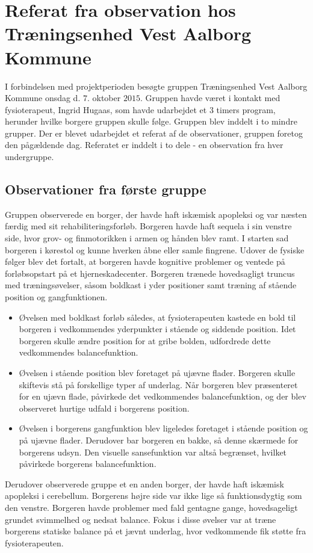 \chapter{Referat fra observation hos Træningsenhed Vest Aalborg Kommune}\label{Ref_observation}
I forbindelsen med projektperioden besøgte gruppen Træningsenhed Vest Aalborg Kommune onsdag d. $7$. oktober $2015$. Gruppen havde været i kontakt med fysioterapeut, Ingrid Hugaas, som havde udarbejdet et $3$ timers program, herunder hvilke borgere gruppen skulle følge. Gruppen blev inddelt i to mindre grupper. Der er blevet udarbejdet et referat af de observationer, gruppen foretog den pågældende dag. Referatet er inddelt i to dele - en observation fra hver undergruppe. 

\section{Observationer fra første gruppe}
Gruppen observerede en borger, der havde haft iskæmisk apopleksi og var næsten færdig med sit rehabiliteringsforløb. Borgeren havde haft sequela i sin venstre side, hvor grov- og finmotorikken i armen og hånden blev ramt. I starten sad borgeren i kørestol og kunne hverken åbne eller samle fingrene. Udover de fysiske følger blev det fortalt, at borgeren havde kognitive problemer og ventede på forløbsopstart på et hjerneskadecenter. Borgeren trænede hovedsagligt truncus med træningsøvelser, såsom boldkast i yder positioner samt træning af stående position og gangfunktionen. 
\begin{itemize}
\item Øvelsen med boldkast forløb således, at fysioterapeuten kastede en bold til borgeren i vedkommendes yderpunkter i stående og siddende position. Idet borgeren skulle ændre position for at gribe bolden, udfordrede dette vedkommendes balancefunktion. 
\item Øvelsen i stående position blev foretaget på ujævne flader. Borgeren skulle skiftevis stå på forskellige typer af underlag. Når borgeren blev præsenteret for en ujævn flade, påvirkede det vedkommendes balancefunktion, og der blev observeret hurtige udfald i borgerens position. 
\item Øvelsen i borgerens gangfunktion blev ligeledes foretaget i stående position og på ujævne flader. Derudover bar borgeren en bakke, så denne skærmede for borgerens udsyn. Den visuelle sansefunktion var altså begrænset, hvilket påvirkede borgerens balancefunktion. 
\end{itemize}
\noindent Derudover observerede gruppe et en anden borger, der havde haft iskæmisk apopleksi i cerebellum. Borgerens højre side var ikke lige så funktionsdygtig som den venstre. Borgeren havde problemer med fald gentagne gange, hovedsageligt grundet svimmelhed og nedsat balance. Fokus i disse øvelser var at træne borgerens statiske balance på et jævnt underlag, hvor vedkommende fik støtte fra fysioterapeuten. 

